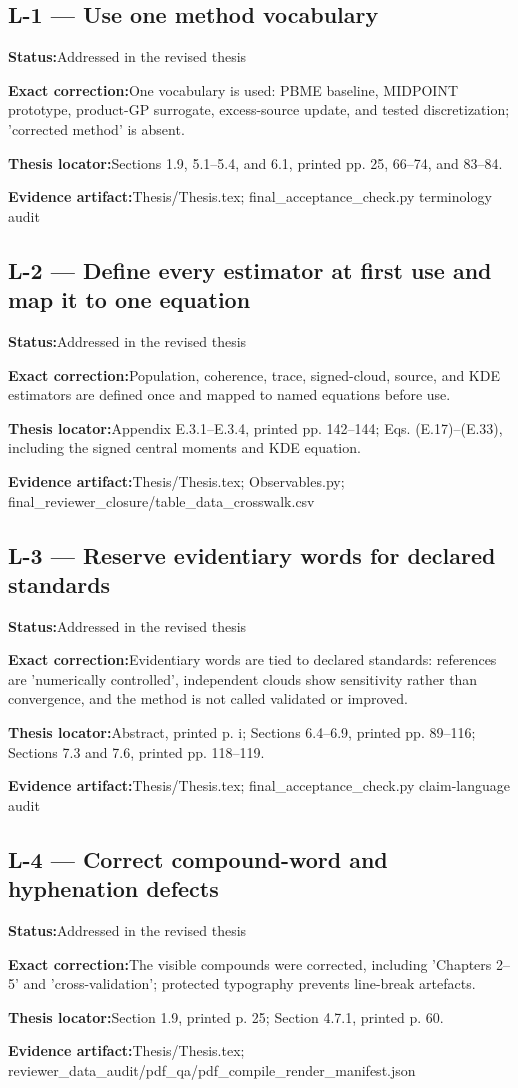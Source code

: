 \documentclass[11pt]{article}
\newcommand{\field}[2]{\textbf{#1}\quad #2\par}
\begin{document}
\subsection*{L-1 --- Use one method vocabulary}
\field{Status:}{Addressed in the revised thesis}
\field{Exact correction:}{One vocabulary is used: PBME baseline, MIDPOINT prototype, product-GP surrogate, excess-source update, and tested discretization; 'corrected method' is absent.}
\field{Thesis locator:}{Sections 1.9, 5.1--5.4, and 6.1, printed pp. 25, 66--74, and 83--84.}
\field{Evidence artifact:}{Thesis/Thesis.tex; final\_acceptance\_check.py terminology audit}
\subsection*{L-2 --- Define every estimator at first use and map it to one equation}
\field{Status:}{Addressed in the revised thesis}
\field{Exact correction:}{Population, coherence, trace, signed-cloud, source, and KDE estimators are defined once and mapped to named equations before use.}
\field{Thesis locator:}{Appendix E.3.1--E.3.4, printed pp. 142--144; Eqs. (E.17)--(E.33), including the signed central moments and KDE equation.}
\field{Evidence artifact:}{Thesis/Thesis.tex; Observables.py; final\_reviewer\_closure/table\_data\_crosswalk.csv}
\subsection*{L-3 --- Reserve evidentiary words for declared standards}
\field{Status:}{Addressed in the revised thesis}
\field{Exact correction:}{Evidentiary words are tied to declared standards: references are 'numerically controlled', independent clouds show sensitivity rather than convergence, and the method is not called validated or improved.}
\field{Thesis locator:}{Abstract, printed p. i; Sections 6.4--6.9, printed pp. 89--116; Sections 7.3 and 7.6, printed pp. 118--119.}
\field{Evidence artifact:}{Thesis/Thesis.tex; final\_acceptance\_check.py claim-language audit}
\subsection*{L-4 --- Correct compound-word and hyphenation defects}
\field{Status:}{Addressed in the revised thesis}
\field{Exact correction:}{The visible compounds were corrected, including 'Chapters 2--5' and 'cross-validation'; protected typography prevents line-break artefacts.}
\field{Thesis locator:}{Section 1.9, printed p. 25; Section 4.7.1, printed p. 60.}
\field{Evidence artifact:}{Thesis/Thesis.tex; reviewer\_data\_audit/pdf\_qa/pdf\_compile\_render\_manifest.json}
\end{document}
